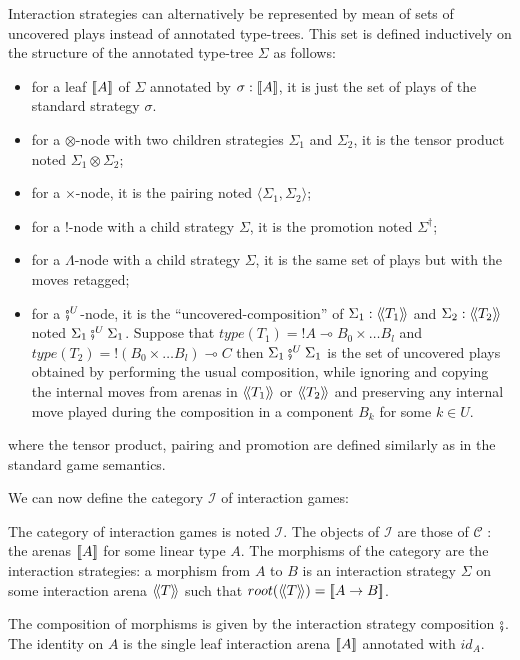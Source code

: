 Interaction strategies can alternatively be represented by mean of sets of
uncovered plays instead of annotated type-trees. This set is defined
inductively on the structure of the annotated type-tree $\Sigma$ as follows:
\begin{itemize}
\item for a leaf ${[\![ A ]\!]}$ of $\Sigma$ annotated by $\sigma :{[\![ A ]\!]}$, it is just the set of plays of the standard strategy $\sigma$.
\item for a $\otimes$-node with two children strategies $\Sigma_1$ and $\Sigma_2$, it is the tensor product noted $\Sigma_1 \otimes \Sigma_2$;
\item for a $\times$-node, it is the pairing noted $\langle \Sigma_1, \Sigma_2 \rangle$;
\item for a $!$-node with a child strategy $\Sigma$, it is the promotion noted $\Sigma^\dagger$;
\item for a $\Lambda$-node with a child strategy $\Sigma$, it is the same set of plays but with the moves retagged;

\item for a $\fatsemi^U$-node, it is the ``uncovered-composition'' of $\Sigma_1 : {\langle\!\langle T_1 \rangle\!\rangle}$ and $\Sigma_2 :{\langle\!\langle T_2 \rangle\!\rangle}$ noted $\Sigma_1
\fatsemi^U \Sigma_1$. Suppose that $type(T_1) = !A \multimap B_0 \times \ldots B_l$ and $type(T_2) = !(B_0 \times \ldots B_l) \multimap C$
then $\Sigma_1
\fatsemi^U \Sigma_1$ is the set of uncovered plays
obtained by performing the usual composition, while ignoring and
copying the internal moves from arenas in ${\langle\!\langle T_1 \rangle\!\rangle}$ or ${\langle\!\langle T_2 \rangle\!\rangle}$
and preserving any internal move played during the composition in a component $B_k$ for some $k \in U$.

\end{itemize}
where the tensor product, pairing and promotion are defined similarly as in the standard game semantics.


We can now define the category $\mathcal{I}$ of interaction games:
\begin{dfn}
The category of interaction games is noted $\mathcal{I}$. The
objects of $\mathcal{I}$ are those of $\mathcal{C}$ : the arenas ${[\![ A ]\!]}$ for some linear type $A$. The morphisms of
the category are the interaction strategies: a morphism from $A$
to $B$ is an interaction strategy $\Sigma$ on some interaction arena
${\langle\!\langle T \rangle\!\rangle}$ such that $root({\langle\!\langle T \rangle\!\rangle}) = {[\![ A\rightarrow B ]\!]}$.

The composition of morphisms is given by the interaction strategy composition $\fatsemi$.
The identity on $A$ is the single leaf interaction arena ${[\![ A ]\!]}$ annotated with $id_A$.
\end{dfn}

